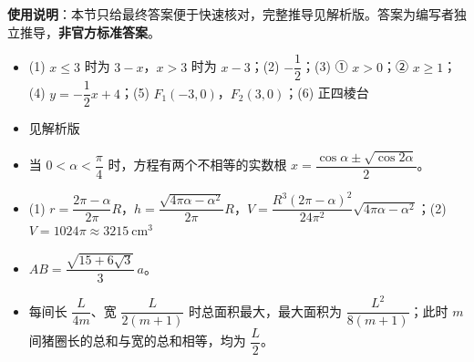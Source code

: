 
\begin{gknotice}
\textbf{使用说明}：本节只给最终答案便于快速核对，完整推导见解析版。答案为编写者独立推导，\textbf{非官方标准答案}。
\end{gknotice}

\begin{itemize}[leftmargin=2.6em]
  \item[\textbf{1.}] (1) $x\le3$ 时为 $3-x$，$x>3$ 时为 $x-3$；(2) $-\dfrac12$；(3) ① $x>0$；② $x\ge1$；(4) $y=-\dfrac12x+4$；(5) $F_1(-3,0)$，$F_2(3,0)$；(6) 正四棱台
  \item[\textbf{2.}] 见解析版
  \item[\textbf{3.}] 当 $0<\alpha<\dfrac{\pi}{4}$ 时，方程有两个不相等的实数根 $x=\dfrac{\cos\alpha\pm\sqrt{\cos2\alpha}}{2}$。
  \item[\textbf{4.}] (1) $r=\dfrac{2\pi-\alpha}{2\pi}R$，$h=\dfrac{\sqrt{4\pi\alpha-\alpha^2}}{2\pi}R$，$V=\dfrac{R^3(2\pi-\alpha)^2}{24\pi^2}\sqrt{4\pi\alpha-\alpha^2}$；(2) $V=1024\pi\approx3215\ \mathrm{cm^3}$
  \item[\textbf{5.}] $AB=\dfrac{\sqrt{15+6\sqrt3}}{3}\,a$。
  \item[\textbf{6.}] 每间长 $\dfrac{L}{4m}$、宽 $\dfrac{L}{2(m+1)}$ 时总面积最大，最大面积为 $\dfrac{L^2}{8(m+1)}$；此时 $m$ 间猪圈长的总和与宽的总和相等，均为 $\dfrac{L}{2}$。
\end{itemize}
